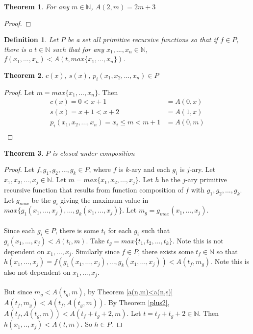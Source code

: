 \documentclass[12pt, letterpaper]{article}
\newtheorem{theorem}{Theorem}
\newtheorem*{definition}{Definition}
\theoremstyle{case}
\begin{document}
    \begin{theorem}
      \label{a(2,m)=2m+3}
      For any $m \in \mathbb{N}$, $A(2, m) = 2m + 3$
    \end{theorem}
    \begin{proof}
    \end{proof}

    
    \begin{definition}
      Let $P$ be a set all primitive recursive functions so that if $f \in P$, there is a $t \in \mathbb{N}$
      such that for any $x_1, ..., x_n \in \mathbb{N}$, $f(x_1, ..., x_n) < A(t, max\{x_1, ..., x_n\})$.
    \end{definition}

    \begin{theorem}
      $c(x)$, $s(x)$, $p_i(x_1, x_2, ..., x_n) \in P$
    \end{theorem}
    \begin{proof}
      Let $m = max\{x_1, ..., x_n\}$.
      Then
      \begin{equation*}
        \begin{aligned}
          c(x) = 0 < x + 1 &= A(0, x) \\
          s(x) = x + 1 < x + 2 &= A(1, x) \\
          p_i(x_1, x_2, ..., x_n) = x_i \leq m < m + 1 &= A(0, m) \\
        \end{aligned}
      \end{equation*}
    \end{proof}

    \begin{theorem}
      $P$ is closed under composition
    \end{theorem}
    \begin{proof}
      Let $f, g_1, g_2, ..., g_k \in P$, where $f$ is $k$-ary and each $g_i$ is $j$-ary.
      Let $x_1, x_2, ..., x_j \in \mathbb{N}$.
      Let $m = max\{x_1, x_2, ..., x_j\}$.
      Let $h$ be the $j$-ary primitive recursive function that results from function composition of $f$ with $g_1, g_2, ..., g_k$.
      Let $g_{max}$ be the $g_i$ giving the maximum value in
      \\
      $max\{g_1(x_1, ..., x_j), ..., g_k(x_1, ..., x_j)\}$.
      Let $m_g = g_{max}(x_1, ..., x_j)$.
      \\
      \\
      Since each $g_i \in P$, there is some $t_i$ for each $g_i$ such that $g_i(x_1, ..., x_j) < A(t_i, m)$.
      Take $t_g = max\{t_1, t_2, ..., t_k\}$. Note this is not dependent on $x_1, ..., x_j$.
      Similarly since $f \in P$, there exists some $t_f \in \mathbb{N}$ so that $h(x_1, ..., x_j) = f(g_1(x_1, ..., x_j), ..., g_k(x_1, ..., x_j)) < A(t_f, m_g)$.
      Note this is also not dependent on $x_1, ..., x_j$.
      \\
      \\
      But since $m_g < A(t_g, m)$, by Theorem \ref{a(n,m)<a(n,s)} $A(t_f, m_g) < A(t_f, A(t_g, m))$.
      By Theorem \ref{plus2}, $A(t_f, A(t_g, m)) < A(t_f + t_g + 2, m)$.
      Let $t = t_f + t_g + 2 \in \mathbb{N}$.
      Then $h(x_1, .., x_j) < A(t, m)$.
      So $h \in P$.
    \end{proof}
\end{document}
